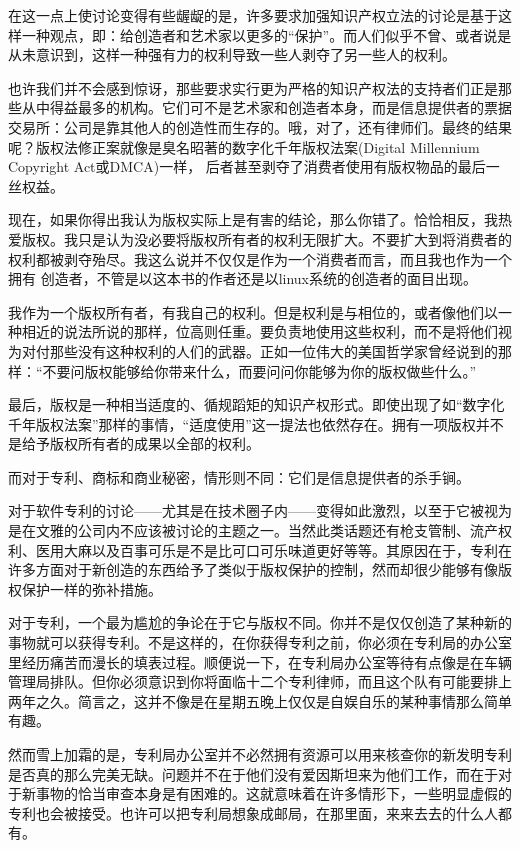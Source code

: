 在这一点上使讨论变得有些龌龊的是，许多要求加强知识产权立法的讨论是基于这样一种观点，即：给创造者和艺术家以更多的“保护”。而人们似乎不曾、或者说是从未意识到，这样一种强有力的权利导致一些人剥夺了另一些人的权利。

也许我们并不会感到惊讶，那些要求实行更为严格的知识产权法的支持者们正是那些从中得益最多的机构。它们可不是艺术家和创造者本身，而是信息提供者的票据交易所：公司是靠其他人的创造性而生存的。哦，对了，还有律师们。最终的结果呢？版权法修正案就像是臭名昭著的数字化千年版权法案(Digital Millennium Copyright Act或DMCA)一样， 后者甚至剥夺了消费者使用有版权物品的最后一丝权益。

现在，如果你得出我认为版权实际上是有害的结论，那么你错了。恰恰相反，我热爱版权。我只是认为没必要将版权所有者的权利无限扩大。不要扩大到将消费者的权利都被剥夺殆尽。我这么说并不仅仅是作为一个消费者而言，而且我也作为一个拥有 创造者，不管是以这本书的作者还是以linux系统的创造者的面目出现。

我作为一个版权所有者，有我自己的权利。但是权利是与相位的，或者像他们以一种相近的说法所说的那样，位高则任重。要负责地使用这些权利，而不是将他们视为对付那些没有这种权利的人们的武器。正如一位伟大的美国哲学家曾经说到的那样：“不要问版权能够给你带来什么，而要问问你能够为你的版权做些什么。”

最后，版权是一种相当适度的、循规蹈矩的知识产权形式。即使出现了如“数字化千年版权法案”那样的事情，“适度使用”这一提法也依然存在。拥有一项版权并不是给予版权所有者的成果以全部的权利。

而对于专利、商标和商业秘密，情形则不同：它们是信息提供者的杀手锏。

对于软件专利的讨论——尤其是在技术圈子内——变得如此激烈，以至于它被视为是在文雅的公司内不应该被讨论的主题之一。当然此类话题还有枪支管制、流产权利、医用大麻以及百事可乐是不是比可口可乐味道更好等等。其原因在于，专利在许多方面对于新创造的东西给予了类似于版权保护的控制，然而却很少能够有像版权保护一样的弥补措施。

对于专利，一个最为尴尬的争论在于它与版权不同。你并不是仅仅创造了某种新的事物就可以获得专利。不是这样的，在你获得专利之前，你必须在专利局的办公室里经历痛苦而漫长的填表过程。顺便说一下，在专利局办公室等待有点像是在车辆管理局排队。但你必须意识到你将面临十二个专利律师，而且这个队有可能要排上两年之久。简言之，这并不像是在星期五晚上仅仅是自娱自乐的某种事情那么简单有趣。

然而雪上加霜的是，专利局办公室并不必然拥有资源可以用来核查你的新发明专利是否真的那么完美无缺。问题并不在于他们没有爱因斯坦来为他们工作，而在于对于新事物的恰当审查本身是有困难的。这就意味着在许多情形下，一些明显虚假的专利也会被接受。也许可以把专利局想象成邮局，在那里面，来来去去的什么人都有。

